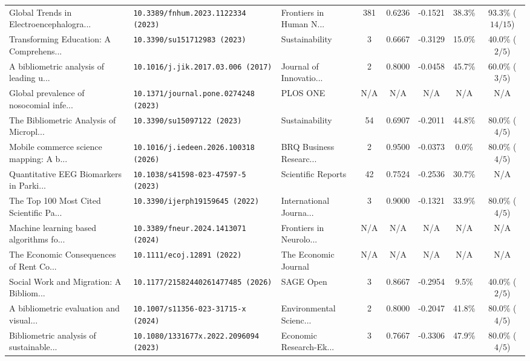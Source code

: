 \begin{table}[t]
{\begin{tabular}{p{4.2cm}p{3.0cm}p{2.4cm}ccccc}
Global Trends in Electroencephalogra... & {\footnotesize\nolinkurl{10.3389/fnhum.2023.1122334 (2023)}} & Frontiers in Human N... & 381 & 0.6236 & -0.1521 & 38.3\% & 93.3\% ($14/15$) \\
Transforming Education: A Comprehens... & {\footnotesize\nolinkurl{10.3390/su151712983 (2023)}} & Sustainability & 3 & 0.6667 & -0.3129 & 15.0\% & 40.0\% ($2/5$) \\
A bibliometric analysis of leading u... & {\footnotesize\nolinkurl{10.1016/j.jik.2017.03.006 (2017)}} & Journal of Innovatio... & 2 & 0.8000 & -0.0458 & 45.7\% & 60.0\% ($3/5$) \\
Global prevalence of nosocomial infe... & {\footnotesize\nolinkurl{10.1371/journal.pone.0274248 (2023)}} & PLOS ONE & N/A & N/A & N/A & N/A & N/A \\
The Bibliometric Analysis of Micropl... & {\footnotesize\nolinkurl{10.3390/su15097122 (2023)}} & Sustainability & 54 & 0.6907 & -0.2011 & 44.8\% & 80.0\% ($4/5$) \\
Mobile commerce science mapping: A b... & {\footnotesize\nolinkurl{10.1016/j.iedeen.2026.100318 (2026)}} & BRQ Business Researc... & 2 & 0.9500 & -0.0373 & 0.0\% & 80.0\% ($4/5$) \\
Quantitative EEG Biomarkers in Parki... & {\footnotesize\nolinkurl{10.1038/s41598-023-47597-5 (2023)}} & Scientific Reports & 42 & 0.7524 & -0.2536 & 30.7\% & N/A \\
The Top 100 Most Cited Scientific Pa... & {\footnotesize\nolinkurl{10.3390/ijerph19159645 (2022)}} & International Journa... & 3 & 0.9000 & -0.1321 & 33.9\% & 80.0\% ($4/5$) \\
Machine learning based algorithms fo... & {\footnotesize\nolinkurl{10.3389/fneur.2024.1413071 (2024)}} & Frontiers in Neurolo... & N/A & N/A & N/A & N/A & N/A \\
The Economic Consequences of Rent Co... & {\footnotesize\nolinkurl{10.1111/ecoj.12891 (2022)}} & The Economic Journal & N/A & N/A & N/A & N/A & N/A \\
Social Work and Migration: A Bibliom... & {\footnotesize\nolinkurl{10.1177/21582440261477485 (2026)}} & SAGE Open & 3 & 0.8667 & -0.2954 & 9.5\% & 40.0\% ($2/5$) \\
A bibliometric evaluation and visual... & {\footnotesize\nolinkurl{10.1007/s11356-023-31715-x (2024)}} & Environmental Scienc... & 2 & 0.8000 & -0.2047 & 41.8\% & 80.0\% ($4/5$) \\
Bibliometric analysis of sustainable... & {\footnotesize\nolinkurl{10.1080/1331677x.2022.2096094 (2023)}} & Economic Research-Ek... & 3 & 0.7667 & -0.3306 & 47.9\% & 80.0\% ($4/5$) \\

\end{tabular}}
\end{table}
